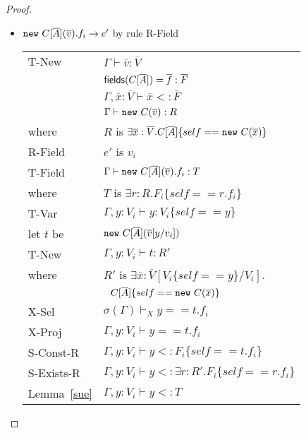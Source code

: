 \begin{proof}
\begin{itemize}
\item ${\tt new}~C[\overline{A}](\overline{v}).f_i \rightarrow e'$ by rule {\sc R-Field}
\\
\begin{tabular}{ll}
{\sc T-New} & $\Gamma\vdash\overline{v}:\overline{V}$
\\
& ${\sf fields}(C[\overline{A}])=\overline{f}:\overline{F}$
\\
& $\Gamma,\overline{x}:\overline{V}\vdash \overline{x}<:\overline{F}$
\\
& $\Gamma\vdash{\tt new}~C(\overline{v}):R$
\\
where & $R$ is $\exists\overline{x}:\overline{V}.C[\overline{A}]\{self=={\tt new}~C(\overline{x})\}$
\\
{\sc R-Field} & $e'$ is $v_i$
\\
{\sc T-Field} &
$\Gamma\vdash{\tt new}~C[\overline{A}](\overline{v}).f_i:T$ \\
where & $T$ is $\exists r:R.F_i\{self==r.f_i\}$
\\
{\sc T-Var} & $\Gamma,y:V_i\vdash y:V_i\{self==y\}$
\\
let $t$ be & ${\tt new}~C[\overline{A}](\overline{v}[y/v_i])$
\\
{\sc T-New} & $\Gamma,y:V_i\vdash t:R'$
\\
where & $R'$ is $\exists\overline{x}:\overline{V}[V_i\{self==y\}/V_i].$\\
& $~~C[\overline{A}]\{self=={\tt new}~C(\overline{x})\}$
\\
{\sc X-Sel} & $\sigma(\Gamma)\vdash_X y==t.f_i$
\\
{\sc X-Proj} & $\Gamma,y:V_i\vdash y==t.f_i$
\\
{\sc S-Const-R} & $\Gamma,y:V_i\vdash y<:F_i\{self==t.f_i\}$
\\
{\sc S-Exists-R} & $\Gamma,y:V_i\vdash y<:\exists r:R'.F_i\{self==r.f_i\}$
\\
Lemma~\ref{sue} & $\Gamma,y:V_i\vdash y<:T$
\end{tabular}



\end{itemize}
\end{proof}
